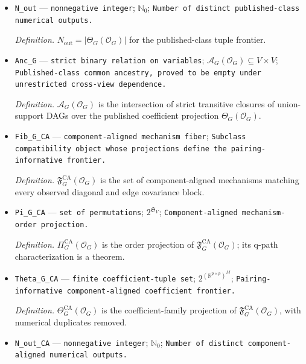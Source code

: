 \documentclass{article}
\begin{document}
\begin{itemize}
  \item \texttt{N\_\allowbreak{}out} --- \texttt{nonnegative integer}; \(\mathbb N_0\); \texttt{Number of distinct published-\allowbreak{}class numerical outputs.}
  \par\smallskip\noindent\emph{Definition.} \(N_{\mathrm{out}}=|\Theta_G(\mathcal O_G)|\) for the published-class tuple frontier.
  \item \texttt{Anc\_\allowbreak{}G} --- \texttt{strict binary relation on variables}; \(\mathcal A_G(\mathcal O_G)\subseteq V\times V\); \texttt{Published-\allowbreak{}class common ancestry,\allowbreak{} proved to be empty under unrestricted cross-\allowbreak{}view dependence.}
  \par\smallskip\noindent\emph{Definition.} \(\mathcal A_G(\mathcal O_G)\) is the intersection of strict transitive closures of union-support DAGs over the published coefficient projection \(\Theta_G(\mathcal O_G)\).
  \item \texttt{Fib\_\allowbreak{}G\_\allowbreak{}CA} --- \texttt{component-\allowbreak{}aligned mechanism fiber}; \texttt{Subclass compatibility object whose projections define the pairing-\allowbreak{}informative frontier.}
  \par\smallskip\noindent\emph{Definition.} \(\mathfrak F_G^{\mathrm{CA}}(\mathcal O_G)\) is the set of component-aligned mechanisms matching every observed diagonal and edge covariance block.
  \item \texttt{Pi\_\allowbreak{}G\_\allowbreak{}CA} --- \texttt{set of permutations}; \(2^{\mathfrak S_V}\); \texttt{Component-\allowbreak{}aligned mechanism-\allowbreak{}order projection.}
  \par\smallskip\noindent\emph{Definition.} \(\Pi_G^{\mathrm{CA}}(\mathcal O_G)\) is the order projection of \(\mathfrak F_G^{\mathrm{CA}}(\mathcal O_G)\); its q-path characterization is a theorem.
  \item \texttt{Theta\_\allowbreak{}G\_\allowbreak{}CA} --- \texttt{finite coefficient-\allowbreak{}tuple set}; \(2^{(\mathbb R^{p\times p})^M}\); \texttt{Pairing-\allowbreak{}informative component-\allowbreak{}aligned coefficient frontier.}
  \par\smallskip\noindent\emph{Definition.} \(\Theta_G^{\mathrm{CA}}(\mathcal O_G)\) is the coefficient-family projection of \(\mathfrak F_G^{\mathrm{CA}}(\mathcal O_G)\), with numerical duplicates removed.
  \item \texttt{N\_\allowbreak{}out\_\allowbreak{}CA} --- \texttt{nonnegative integer}; \(\mathbb N_0\); \texttt{Number of distinct component-\allowbreak{}aligned numerical outputs.}

\end{itemize}
\end{document}
